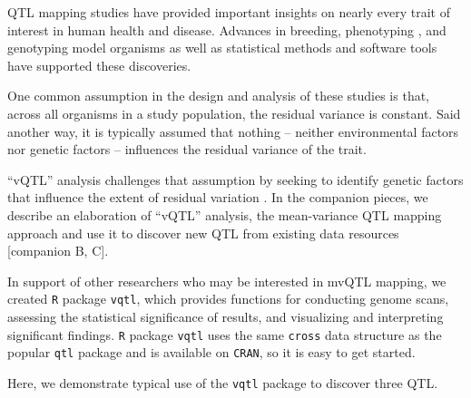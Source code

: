 \documentclass{article}
\begin{document}
QTL mapping studies have provided important insights on nearly every trait of interest in human health and disease.
Advances in breeding, phenotyping \citep{Yang2014a}, and genotyping \citep{Williams1990} model organisms as well as statistical methods \citep{Lander1989a} and software tools \citep{Broman2003} have supported these discoveries.

One common assumption in the design and analysis of these studies is that, across all organisms in a study population, the residual variance is constant.
Said another way, it is typically assumed that nothing -- neither environmental factors nor genetic factors -- influences the residual variance of the trait.



``vQTL'' analysis challenges that assumption by seeking to identify genetic factors that influence the extent of residual variation \citep{Ronnegard2011a,Ronnegard2012,Cao2014}.
In the companion pieces, we describe an elaboration of ``vQTL'' analysis, the mean-variance QTL mapping approach and use it to discover new QTL from existing data resources [companion B, C].

In support of other researchers who may be interested in mvQTL mapping, we created \texttt{R} package \texttt{vqtl}, which provides functions for conducting genome scans, assessing the statistical significance of results, and visualizing and interpreting significant findings.
\texttt{R} package \texttt{vqtl} uses the same \texttt{cross} data structure as the popular \texttt{qtl} package and is available on \texttt{CRAN}, so it is easy to get started.

Here, we demonstrate typical use of the \texttt{vqtl} package to discover three QTL.
\end{document}
